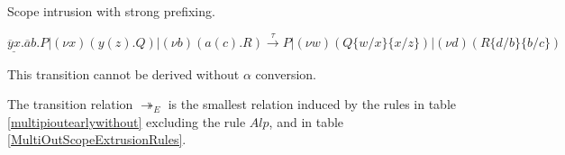 \begin{example} Scope intrusion with strong prefixing.
  \begin{center}
    $\underline{\overline{y}x}.\overline{a}b.P|(\nu x)(y(z).Q)|(\nu b)(a(c).R) \xrightarrow{\tau} P|(\nu w)(Q\{w/x\}\{x/z\})|(\nu d)(R\{d/b\}\{b/c\})$
  \end{center}
  This transition cannot be derived without $\alpha$ conversion.
\end{example}


% 
% 


\begin{definition}
  The transition relation $\twoheadrightarrow_{E}$ is the smallest relation induced by the rules in table \ref{multipioutearlywithout} excluding the rule $Alp$, and in table \ref{MultiOutScopeExtrusionRules}.
\end{definition}

